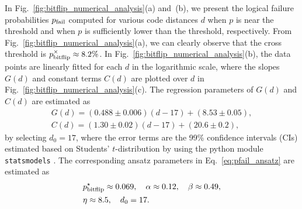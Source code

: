 \documentclass[a4paper,twocolumn,11pt,accepted=2025-01-21]{quantumarticle}
\theoremstyle{definition}
\theoremstyle{definition}
\theoremstyle{definition}
\begin{document}
In Fig.~\ref{fig:bitflip_numerical_analysis}(a) and~(b), we present the logical failure probabilities $p_{\mathrm{fail}}$ computed for various code distances $d$ when $p$ is near the threshold and when $p$ is sufficiently lower than the threshold, respectively.
From Fig.~\ref{fig:bitflip_numerical_analysis}(a), we can clearly observe that the cross threshold is $p^\times_{\mathrm{bitflip}} \approx 8.2\%$.
In Fig.~\ref{fig:bitflip_numerical_analysis}(b), the data points are linearly fitted for each $d$ in the logarithmic scale, where the slopes $G(d)$ and constant terms $C(d)$ are plotted over $d$ in Fig.~\ref{fig:bitflip_numerical_analysis}(c).
The regression parameters of $G(d)$ and $C(d)$ are estimated as
\begin{align*}
    G(d) = (0.488 \pm 0.006) (d - 17) + (8.53 \pm 0.05), \\
    C(d) = (1.30 \pm 0.02) (d - 17) + (20.6 \pm 0.2),
\end{align*}
by selecting $d_0 = 17$, where the error terms are the 99\% confidence intervals (CIs) estimated based on Students' $t$-distribution by using the python module \texttt{statsmodels} \cite{seabold2010statsmodels}.
The corresponding ansatz parameters in Eq.~\eqref{eq:pfail_ansatz} are estimated as
\begin{align}
    \begin{split}
        &p^\star_{\mathrm{bitflip}} \approx 0.069, \quad \alpha \approx 0.12, \quad \beta \approx 0.49, \\ 
        &\eta \approx 8.5, \quad d_0 = 17.
    \end{split}
    \label{eq:ansatz_parameters_bitflip}
\end{align}

\end{document}
